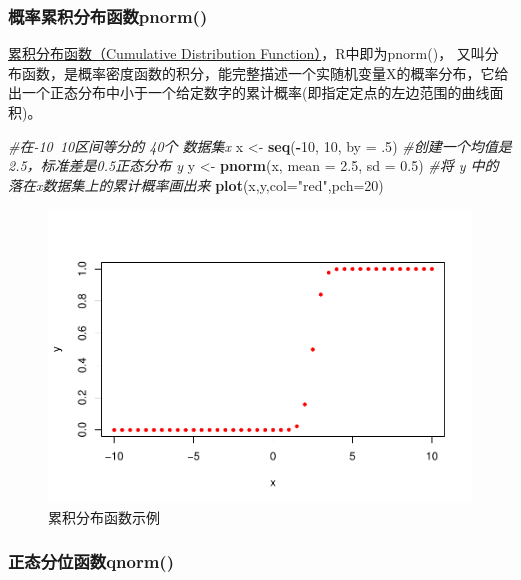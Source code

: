 \documentclass[
]{article}
\newenvironment{Shaded}{\begin{snugshade}}{\end{snugshade}}
\newcommand{\CommentTok}[1]{\textcolor[rgb]{0.56,0.35,0.01}{\textit{#1}}}
\newcommand{\DataTypeTok}[1]{\textcolor[rgb]{0.13,0.29,0.53}{#1}}
\newcommand{\DecValTok}[1]{\textcolor[rgb]{0.00,0.00,0.81}{#1}}
\newcommand{\FloatTok}[1]{\textcolor[rgb]{0.00,0.00,0.81}{#1}}
\newcommand{\KeywordTok}[1]{\textcolor[rgb]{0.13,0.29,0.53}{\textbf{#1}}}
\newcommand{\NormalTok}[1]{#1}
\newcommand{\OperatorTok}[1]{\textcolor[rgb]{0.81,0.36,0.00}{\textbf{#1}}}
\newcommand{\StringTok}[1]{\textcolor[rgb]{0.31,0.60,0.02}{#1}}
\begin{document}
\hypertarget{ux6982ux7387ux7d2fux79efux5206ux5e03ux51fdux6570pnorm}{%
\subsubsection{概率累积分布函数pnorm()}\label{ux6982ux7387ux7d2fux79efux5206ux5e03ux51fdux6570pnorm}}

\href{https://zh.wikipedia.org/wiki/\%E7\%B4\%AF\%E7\%A7\%AF\%E5\%88\%86\%E5\%B8\%83\%E5\%87\%BD\%E6\%95\%B0}{累积分布函数（Cumulative Distribution Function）}，R中即为pnorm()，
又叫分布函数，是概率密度函数的积分，能完整描述一个实随机变量X的概率分布，它给出一个正态分布中小于一个给定数字的累计概率(即指定定点的左边范围的曲线面积)。

\begin{Shaded}
\begin{Highlighting}[]
\CommentTok{#在-10~10区间等分的 40个 数据集x}
\NormalTok{x <-}\StringTok{ }\KeywordTok{seq}\NormalTok{(}\OperatorTok{-}\DecValTok{10}\NormalTok{, }\DecValTok{10}\NormalTok{, }\DataTypeTok{by =} \FloatTok{.5}\NormalTok{)}
\CommentTok{#创建一个均值是2.5，标准差是0.5正态分布 y}
\NormalTok{y <-}\StringTok{ }\KeywordTok{pnorm}\NormalTok{(x, }\DataTypeTok{mean =} \FloatTok{2.5}\NormalTok{, }\DataTypeTok{sd =} \FloatTok{0.5}\NormalTok{)}
\CommentTok{#将 y 中的落在x数据集上的累计概率画出来}
\KeywordTok{plot}\NormalTok{(x,y,}\DataTypeTok{col=}\StringTok{"red"}\NormalTok{,}\DataTypeTok{pch=}\DecValTok{20}\NormalTok{)}
\end{Highlighting}
\end{Shaded}

\begin{figure}

{\centering \includegraphics[width=0.49\linewidth,height=0.49\textheight]{figs/pnorm} 

}

\caption{累积分布函数示例}\label{fig:pnorm}
\end{figure}

\hypertarget{ux6b63ux6001ux5206ux4f4dux51fdux6570qnorm}{%
\subsubsection{正态分位函数qnorm()}\label{ux6b63ux6001ux5206ux4f4dux51fdux6570qnorm}}
\end{document}
